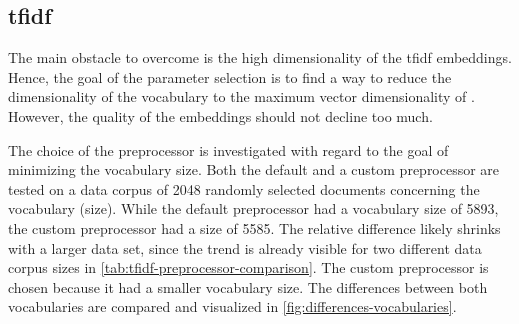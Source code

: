 \subsection*{\acs{tfidf}}\label{subsec:evaluation-tfidf}

The main obstacle to overcome is the high dimensionality of the \ac{tfidf} embeddings.
Hence, the goal of the parameter selection is to find a way to reduce the dimensionality of the vocabulary to the maximum vector dimensionality of \databaseName{}.
However, the quality of the embeddings should not decline too much.

The choice of the preprocessor is investigated with regard to the goal of minimizing the vocabulary size.
Both the default and a custom preprocessor are tested on a data corpus of 2048 randomly selected documents concerning the vocabulary (size).
While the default preprocessor had a vocabulary size of 5893, the custom preprocessor had a size of 5585.
The relative difference likely shrinks with a larger data set, 
since the trend is already visible for two different data corpus sizes in \autoref{tab:tfidf-preprocessor-comparison}.
The custom preprocessor is chosen because it had a smaller vocabulary size.
The differences between both vocabularies are compared and visualized in \autoref{fig:differences-vocabularies}.

